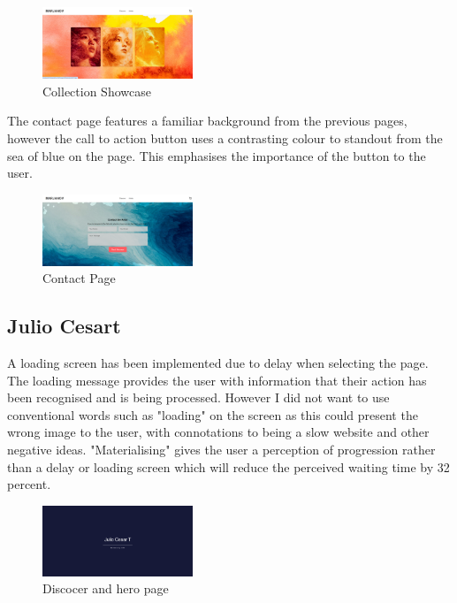\documentclass[]{project_final}
\begin{document}
\begin{figure}[ht!]
    \centering
    \includegraphics[width=0.4\textwidth]{AG15.png}
    \vspace*{0.0cm}
    \caption{Collection Showcase}
    \label{fig:1}
\end{figure}

The contact page features a familiar background from the previous pages, however the call to action button uses a contrasting colour to standout from the sea of blue on the page. This emphasises the importance of the button to the user.

\begin{figure}[ht!]
    \centering
    \includegraphics[width=0.4\textwidth]{AG16.png}
    \vspace*{0.0cm}
    \caption{Contact Page}
    \label{fig:1}
\end{figure}

\subsection{Julio Cesart}

A loading screen has been implemented due to delay when selecting the page. The loading message provides the user with information that their action has been recognised and is being processed. However I did not want to use conventional words such as "loading" on the screen as this could present the wrong image to the user, with connotations to being a slow website and other negative ideas. "Materialising" gives the user a perception of progression rather than a delay or loading screen which will reduce the perceived waiting time by 32 percent.

\begin{figure}[ht!]
    \centering
    \includegraphics[width=0.4\textwidth]{AG25.png}
    \vspace*{0.0cm}
    \caption{Discocer and hero page}
    \label{fig:1}
\end{figure}
\end{document}
